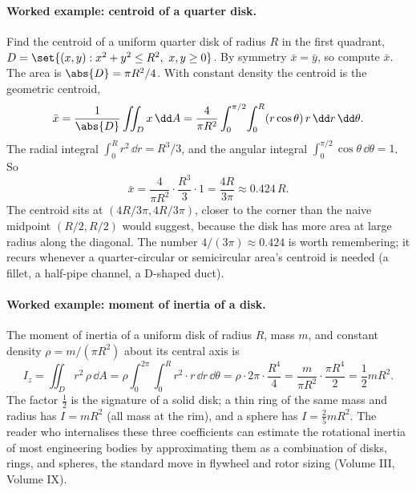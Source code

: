 \paragraph{Worked example: centroid of a quarter disk.} Find the
centroid of a uniform quarter disk of radius $R$ in the first
quadrant, $D = \set{(x, y) : x^{2} + y^{2} \leq R^{2},\ x, y \geq
0}$. By symmetry $\bar{x} = \bar{y}$, so compute $\bar{x}$. The area
is $\abs{D} = \pi R^{2}/4$. With constant density the centroid is
the geometric centroid,
\[
\bar{x} = \frac{1}{\abs{D}}\iint_{D} x\,\dd A
= \frac{4}{\pi R^{2}}\int_{0}^{\pi/2}\!\int_{0}^{R}
(r\cos\theta)\,r\,\dd r\,\dd\theta.
\]
The radial integral $\int_{0}^{R} r^{2}\,\dd r = R^{3}/3$, and the
angular integral $\int_{0}^{\pi/2}\cos\theta\,\dd\theta = 1$. So
\[
\bar{x} = \frac{4}{\pi R^{2}}\cdot\frac{R^{3}}{3}\cdot 1
= \frac{4 R}{3\pi} \approx 0.424\,R.
\]
The centroid sits at $(4R/3\pi, 4R/3\pi)$, closer to the corner than
the naive midpoint $(R/2, R/2)$ would suggest, because the disk has
more area at large radius along the diagonal. The number $4/(3\pi)
\approx 0.424$ is worth remembering; it recurs whenever a
quarter-circular or semicircular area's centroid is needed (a fillet,
a half-pipe channel, a D-shaped duct).

\paragraph{Worked example: moment of inertia of a disk.} The moment
of inertia of a uniform disk of radius $R$, mass $m$, and constant
density $\rho = m/(\pi R^{2})$ about its central axis is
\[
I_{z} = \iint_{D} r^{2}\,\rho\,\dd A
= \rho\int_{0}^{2\pi}\!\int_{0}^{R} r^{2}\cdot r\,\dd r\,\dd\theta
= \rho\cdot 2\pi\cdot\frac{R^{4}}{4}
= \frac{m}{\pi R^{2}}\cdot\frac{\pi R^{4}}{2}
= \frac{1}{2} m R^{2}.
\]
The factor $\tfrac{1}{2}$ is the signature of a solid disk; a thin
ring of the same mass and radius has $I = m R^{2}$ (all mass at the
rim), and a sphere has $I = \tfrac{2}{5} m R^{2}$. The reader who
internalises these three coefficients can estimate the rotational
inertia of most engineering bodies by approximating them as a
combination of disks, rings, and spheres, the standard move in
flywheel and rotor sizing (Volume III, Volume IX).

